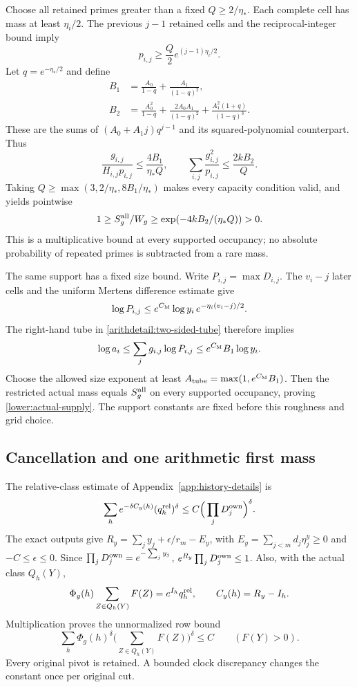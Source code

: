 Choose all retained primes greater than a fixed $Q\geq2/\eta_*$.
Each complete cell has mass at least $\eta_i/2$. The previous $j-1$
retained cells and the reciprocal-integer bound imply
\[
 p_{i,j}\geq\frac Q2e^{(j-1)\eta_i/2}.
\]
Let $q=e^{-\eta_*/2}$ and define
\begin{align*}
 B_1&=\frac{A_0}{1-q}+\frac{A_1}{(1-q)^2},\\
 B_2&=\frac{A_0^2}{1-q}
   +\frac{2A_0A_1}{(1-q)^2}
   +\frac{A_1^2(1+q)}{(1-q)^3}.
\end{align*}
These are the sums of $(A_0+A_1j)q^{j-1}$ and its squared-polynomial
counterpart. Thus
\[
 \frac{g_{i,j}}{H_{i,j}p_{i,j}}\leq\frac{4B_1}{\eta_*Q},
 \qquad
 \sum_{i,j}\frac{g_{i,j}^2}{p_{i,j}}\leq\frac{2kB_2}{Q}.
\]
Taking $Q\geq\max(3,2/\eta_*,8B_1/\eta_*)$ makes every capacity
condition valid, and yields pointwise
\begin{equation}
 1\geq S_g^{\rm all}/W_g
 \geq\exp(-4kB_2/(\eta_*Q))>0.
 \label{arithdetail:uniform-supply}
\end{equation}
This is a multiplicative bound at every supported occupancy; no
absolute probability of repeated primes is subtracted from a rare mass.

The same support has a fixed size bound. Write $P_{i,j}=\max D_{i,j}$.
The $v_i-j$ later cells and the uniform Mertens difference estimate give
\[
 \log P_{i,j}\leq e^{C_{\rm M}}\log y_i\,
                         e^{-\eta_i(v_i-j)/2}.
\]
The right-hand tube in \eqref{arithdetail:two-sided-tube} therefore implies
\[
 \log a_i\leq\sum_jg_{i,j}\log P_{i,j}
 \leq e^{C_{\rm M}}B_1\log y_i.
\]
Choose the allowed size exponent at least
$A_{\rm tube}=\max(1,e^{C_{\rm M}}B_1)$.
Then the restricted actual mass equals $S_g^{\rm all}$ on every
supported occupancy, proving \eqref{lower:actual-supply}. The support
constants are fixed before this roughness and grid choice.

\subsection{Cancellation and one arithmetic first mass}
\label{arithdetail:first-mass}
The relative-class estimate of Appendix~\ref{app:history-details} is
\[
 \sum_h e^{-\delta C_y(h)}(q_h^{\rm rel})^\delta
 \leq C\Big(\prod_jD_j^{\rm own}\Big)^\delta.
\]
The exact outputs give
$R_y=\sum_jy_j+\epsilon/r_m-E_y$, with
$E_y=\sum_{j<m}d_j\eta_j^y\geq0$ and $-C\leq\epsilon\leq0$.
Since $\prod_jD_j^{\rm own}=e^{-\sum_jy_j}$,
$e^{R_y}\prod_jD_j^{\rm own}\leq1$.
Also, with the actual class $Q_h(Y)$,
\[
 \Phi_g(h)\sum_{Z\in Q_h(Y)}F(Z)=e^{I_h}q_h^{\rm rel},
 \qquad C_y(h)=R_y-I_h.
\]
Multiplication proves the unnormalized row bound
\[
 \sum_h\Phi_g(h)^\delta
       \Big(\sum_{Z\in Q_h(Y)}F(Z)\Big)^\delta\leq C
 \qquad(F(Y)>0).
\]
Every original pivot is retained. A bounded clock discrepancy changes
the constant once per original cut.

